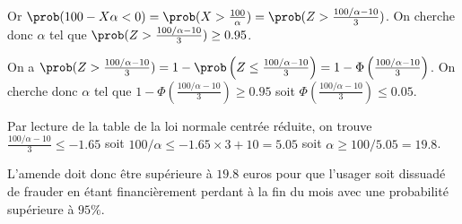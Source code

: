 {{        Or $\prob(100-X\alpha<0) = \prob(X>\frac{100}{\alpha}) = \prob(Z>\frac{100/\alpha-10}{3})$. On cherche donc $\alpha$ tel que $\prob(Z>\frac{100/\alpha-10}{3}) \geq 0.95$. 

        On a $\prob(Z>\frac{100/\alpha-10}{3}) = 1-\prob\left(Z\leq\frac{100/\alpha-10}{3}\right) = 1-\Phi\left(\frac{100/\alpha-10}{3}\right)$. On cherche donc $\alpha$ tel que $1-\Phi\left(\frac{100/\alpha-10}{3}\right) \geq 0.95$ soit $\Phi\left(\frac{100/\alpha-10}{3}\right) \leq 0.05$. 

        Par lecture de la table de la loi normale centrée réduite, on trouve $\frac{100/\alpha-10}{3} \leq -1.65$ soit $100/\alpha \leq -1.65\times3+10 = 5.05$ soit $\alpha \geq 100/5.05 = 19.8$.

        L'amende doit donc être supérieure à $19.8$ euros pour que l'usager soit dissuadé de frauder en étant financièrement perdant à la fin du mois avec une probabilité supérieure à $95\%$.

    }
}
